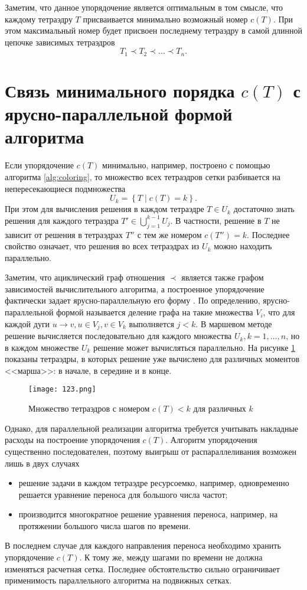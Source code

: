 Заметим, что данное упорядочение является оптимальным в том смысле, что каждому тетраэдру $T$ присваивается минимально возможный номер $c(T)$. При этом максимальный номер будет присвоен последнему тетраэдру в самой длинной цепочке зависимых тетраэдров
\[
T_1 \prec T_2 \prec \dots \prec T_n.
\]

\section{Связь минимального порядка $c(T)$ с ярусно-параллельной формой алгоритма}

Если упорядочение $c(T)$ минимально, например, построено с помощью алгоритма \ref{alg:coloring}, то множество всех тетраэдров сетки разбивается на непересекающиеся подмножества
\[
U_k = \left\{T \mid c(T) = k\right\}.
\]
При этом для вычисления решения в каждом тетраэдре $T \in U_k$ достаточно знать решения для каждого тетраэдра $T' \in \bigcup_{j = 1}^{k - 1} U_j$. В частности, решение в $T$ не зависит от решения в тетраэдрах $T''$ с тем же номером $c(T'') = k$. Последнее свойство означает, что решения во всех тетраэдрах из $U_k$ можно находить параллельно.

Заметим, что ациклический граф отношения $\prec$ является также графом зависимостей вычислительного алгоритма, а построенное упорядочение фактически задает ярусно-параллельную его форму \cite{Karpov2014}. По определению, ярусно-параллельной формой называется деление графа на такие множества $V_i$, что для каждой дуги $u \to v, u \in V_j, v \in V_k$ выполняется $j < k$.
В маршевом методе решение вычисляется последовательно для каждого множества $U_k, k = 1, \dots, n$, но в каждом множестве $U_k$ решение может вычисляться параллельно. На рисунке \ref{fig:marching} показаны тетраэдры, в которых решение уже вычислено для различных моментов <<марша>>: в начале, в середине и в конце.

\begin{figure}[ht!]
\centering
\texttt{[image: 123.png]}
\caption{Множество тетраэдров с номером $c(T) < k$ для различных $k$}
\label{fig:marching}
\end{figure}

Однако, для параллельной реализации алгоритма требуется учитывать накладные расходы на построение упорядочения $c(T)$. Алгоритм упорядочения существенно последователен, поэтому выигрыш от распараллеливания возможен лишь в двух случаях
\begin{itemize}
\item решение задачи в каждом тетраэдре ресурсоемко, например, одновременно решается уравнение переноса для большого числа частот;
\item производится многократное решение уравнения переноса, например, на протяжении большого числа шагов по времени.
\end{itemize}
В последнем случае для каждого направления переноса необходимо хранить упорядочение $c(T)$. К тому же, между шагами по времени не должна изменяться расчетная сетка. Последнее обстоятельство сильно ограничивает применимость параллельного алгоритма на подвижных сетках.